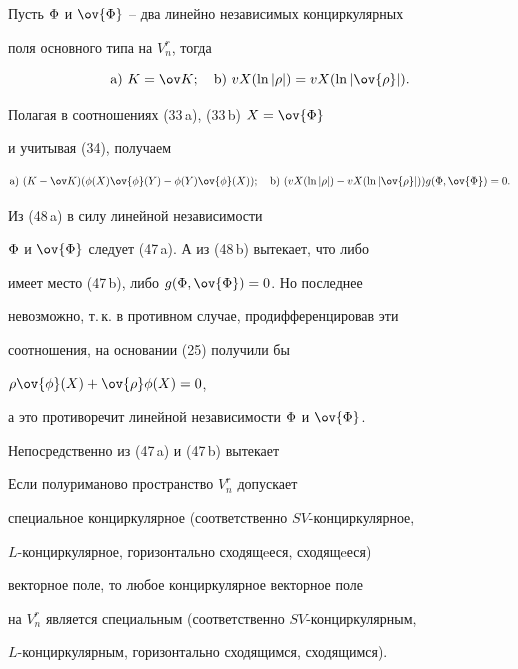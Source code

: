 \begin{lem}


Пусть $\Phi$ и $\ov{\F}$ -- два линейно независимых конциркулярных


поля основного типа на $V^r_n$, тогда


\begin{equation}


\mathrm a)\ K=\ov K;\quad \mathrm b)\ {vX}(\ln{|\ro|})={vX}(\ln{|\ov{\ro}|}).


\end{equation}


\end{lem}





\begin{pf}


Полагая в соотношениях (33\,a), (33\,b) $X=\ov {\F}$


и учитывая (34), получаем


\begin{equation}


\mathrm a)\ (K - \ov K)(\f(X) \ov{\f}(Y) - \f(Y)\ov{\f}(X)); \quad


\mathrm b)\ ( {vX}(\ln{|\ro|})-{vX}(\ln{|\ov{\ro}|}))


g(\F,\ov{\F})=0.


\end{equation}


Из (48\,a) в силу линейной независимости


$\Phi$ и $\ov{\F}$ следует (47\,a). А из (48\,b) вытекает, что либо


имеет место (47\,b), либо $g(\F,\ov{\F})=0$. Но последнее


невозможно, т.\,к. в противном случае, продифференцировав эти


соотношения, на основании (25) получили бы


$\ro\ov{\f}(X)+\ov{\ro}\f(X)=0$,


а это противоречит линейной независимости $\Phi$ и $\ov{\F}$.


\end{pf}





Непосредственно из (47\,a) и (47\,b) вытекает





\begin{cor}


Если полуриманово пространство $V^r_n$ допускает


специальное конциркулярное (соответственно $SV$-конциркулярное,


$L$-конциркулярное, горизонтально сходящeеся, сходящeеся)


векторное поле, то любое конциркулярное векторное поле


на $V^r_n$ является специальным (соответственно $SV$-конциркулярным,


$L$-конциркулярным, горизонтально сходящимся, сходящимся).


\end{cor}





